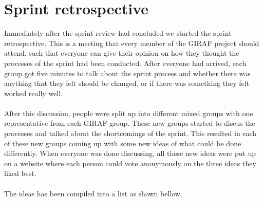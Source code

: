 \section{Sprint retrospective}
Immediately after the sprint review had concluded we started the sprint retrospective.
This is a meeting that every member of the GIRAF project should attend, such that everyone can give their opinion on how they thought the processes of the sprint had been conducted.
After everyone had arrived, each group got five minutes to talk about the sprint process and whether there was anything that they felt should be changed, or if there was something they felt worked really well.
\\\\
After this discussion, people were split up into different mixed groups with one representative from each GIRAF group.
These new groups started to discus the processes and talked about the shortcomings of the sprint.
This resulted in each of these new groups coming up with some new ideas of what could be done differently.
When everyone was done discussing, all these new ideas were put up on a website where each person could vote anonymously on the three ideas they liked best.
\\\\
The ideas has been compiled into a list as shown bellow.
